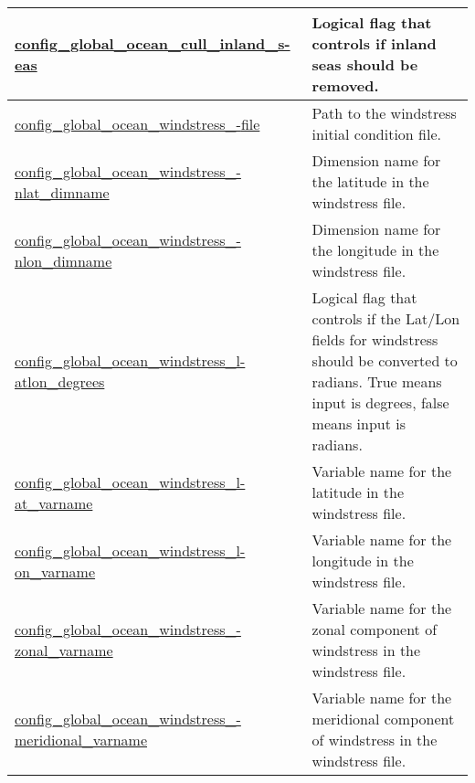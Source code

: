 {\begin{center}
\begin{longtable}{| p{2.0in} || p{4.0in} |}
    \hline
    \hyperref[subsec:nm_sec_config_global_ocean_cull_inland_seas]{config\_global\_ocean\_cull\_inland\_s-}\hyperref[subsec:nm_sec_config_global_ocean_cull_inland_seas]{eas}& Logical flag that controls if inland seas should be removed. \\
    \hline
    \hyperref[subsec:nm_sec_config_global_ocean_windstress_file]{config\_global\_ocean\_windstress\_-}\hyperref[subsec:nm_sec_config_global_ocean_windstress_file]{file}& Path to the windstress initial condition file. \\
    \hline
    \hyperref[subsec:nm_sec_config_global_ocean_windstress_nlat_dimname]{config\_global\_ocean\_windstress\_-}\hyperref[subsec:nm_sec_config_global_ocean_windstress_nlat_dimname]{nlat\_dimname}& Dimension name for the latitude in the windstress file. \\
    \hline
    \hyperref[subsec:nm_sec_config_global_ocean_windstress_nlon_dimname]{config\_global\_ocean\_windstress\_-}\hyperref[subsec:nm_sec_config_global_ocean_windstress_nlon_dimname]{nlon\_dimname}& Dimension name for the longitude in the windstress file. \\
    \hline
    \hyperref[subsec:nm_sec_config_global_ocean_windstress_latlon_degrees]{config\_global\_ocean\_windstress\_l-}\hyperref[subsec:nm_sec_config_global_ocean_windstress_latlon_degrees]{atlon\_degrees}& Logical flag that controls if the Lat/Lon fields for windstress should be converted to radians. True means input is degrees, false means input is radians. \\
    \hline
    \hyperref[subsec:nm_sec_config_global_ocean_windstress_lat_varname]{config\_global\_ocean\_windstress\_l-}\hyperref[subsec:nm_sec_config_global_ocean_windstress_lat_varname]{at\_varname}& Variable name for the latitude in the windstress file. \\
    \hline
    \hyperref[subsec:nm_sec_config_global_ocean_windstress_lon_varname]{config\_global\_ocean\_windstress\_l-}\hyperref[subsec:nm_sec_config_global_ocean_windstress_lon_varname]{on\_varname}& Variable name for the longitude in the windstress file. \\
    \hline
    \hyperref[subsec:nm_sec_config_global_ocean_windstress_zonal_varname]{config\_global\_ocean\_windstress\_-}\hyperref[subsec:nm_sec_config_global_ocean_windstress_zonal_varname]{zonal\_varname}& Variable name for the zonal component of windstress in the windstress file. \\
    \hline
    \hyperref[subsec:nm_sec_config_global_ocean_windstress_meridional_varname]{config\_global\_ocean\_windstress\_-}\hyperref[subsec:nm_sec_config_global_ocean_windstress_meridional_varname]{meridional\_varname}& Variable name for the meridional component of windstress in the windstress file. \\

\end{longtable}
\end{center}}
